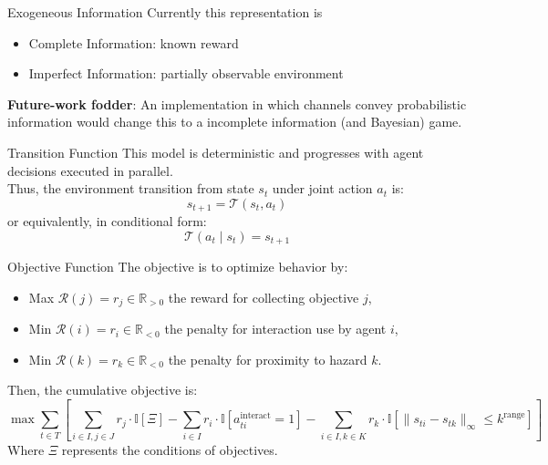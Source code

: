 \begin{frame}{Exogeneous Information}
    Currently this representation is
    \begin{itemize}
        \item Complete Information: known reward
        \item Imperfect Information: partially observable environment
    \end{itemize} 
    \textbf{Future-work fodder}: An implementation in which channels convey probabilistic 
    information would change this to a incomplete information (and Bayesian) game.
\end{frame}

\begin{frame}{Transition Function}
    This model is deterministic and progresses with agent decisions executed in parallel.\\[1em]
    Thus, the environment transition from state \(s_t\) under joint action \(a_t\) is:
    \[
        s_{t+1} = \mathcal{T}(s_t, a_t)
    \]
    or equivalently, in conditional form:
    \[
        \mathcal{T}(a_t \mid s_t) = s_{t+1}
    \]
\end{frame}

\begin{frame}{Objective Function}
    The objective is to optimize behavior by:
    \begin{itemize}
        \item Max \(\mathcal{R}(j) = r_{j} \in \mathbb{R}_{>0}\) the reward for collecting objective \(j\),
        \item Min \(\mathcal{R}(i) = r_{i} \in \mathbb{R}_{<0}\) the penalty for interaction use by agent \(i\),
        \item Min \(\mathcal{R}(k) = r_{k} \in \mathbb{R}_{<0}\) the penalty for proximity to hazard \(k\).
    \end{itemize}
    Then, the cumulative objective is:
    \[ 
        \max \sum_{t\in T} \left[
            \sum_{i\in I, j\in J} r_{j} \cdot \mathbb{I}\left[ \Xi \right]
            - \sum_{i\in I} r_{i} \cdot \mathbb{I}\left[a_{ti}^\text{interact} = 1\right]
            - \sum_{i\in I, k\in K} r_{k} \cdot \mathbb{I}\left[\|s_{ti} - s_{tk}\|_\infty
            \leq k^\text{range}\right]
        \right]
    \]
    Where $\Xi$ represents the conditions of objectives.
\end{frame}

